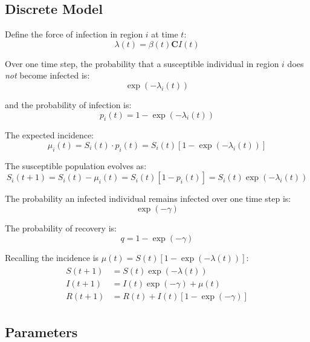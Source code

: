 \subsection{Discrete Model}
Define the force of infection in region $i$ at time $t$:
\begin{equation*}
\lambda(t) = \beta(t) \mathbf{C}I(t)
\end{equation*}

Over one time step, the probability that a susceptible individual in
region $i$ does \emph{not} become infected is:
\begin{equation*}
\exp(-\lambda_i(t))
\end{equation*}

and the probability of infection is:
\begin{equation*}
p_i(t) = 1 - \exp(-\lambda_i(t))
\end{equation*}

The expected incidence:
\begin{equation*}
\mu_i(t) = S_i(t) \cdot p_i(t) = S_i(t) \left[1 - \exp(-\lambda_i(t))\right]
\end{equation*}

The susceptible population evolves as:
\begin{equation*}
S_i(t+1) = S_i(t) - \mu_i(t) = S_i(t) [1 - p_i(t)] = S_i(t) \exp(-\lambda_i(t))
\end{equation*}


The probability an infected individual remains infected over one time
step is:
\begin{equation*}
\exp(-\gamma)
\end{equation*}

The probability of recovery is:
\begin{equation*}
q = 1 - \exp(-\gamma)
\end{equation*}

Recalling the incidence is $\mu(t) = S(t) [1 - \exp(-\lambda(t))]$:
\begin{align}\begin{split}\label{eq:exp_sir_compact}
S(t+1) &= S(t) \exp(-\lambda(t)) \\
I(t+1) &= I(t) \exp(-\gamma) + \mu(t) \\
R(t+1) &= R(t) + I(t) [1 - \exp(-\gamma)]
\end{split}\end{align}


\subsection{Parameters}

